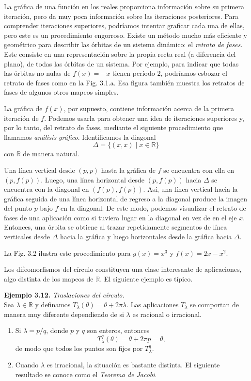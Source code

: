 \documentclass[10pt,a4paper]{book}
\begin{document}
La gráfica de una función en los reales proporciona información sobre su primera iteración, pero da muy poca información sobre las iteraciones posteriores. Para comprender iteraciones superiores, podríamos intentar graficar cada una de ellas, pero este es un procedimiento engorroso. Existe un método mucho más eficiente y geométrico para describir las órbitas de un sistema dinámico: el \emph{retrato de fases}. Este consiste en una representación sobre la propia recta real (a diferencia del plano), de todas las órbitas de un sistema.  Por ejemplo, para indicar que todas las órbitas no nulas de $f(x)=-x$ tienen período $2$, podríamos esbozar el retrato de fases como en la Fig. 3.1.a. Esa figura también muestra los retratos de fases de algunos otros mapeos simples.

\medskip

La gráfica de $f(x)$, por supuesto, contiene información acerca de la primera iteración de $f$. Podemos usarla para obtener una idea de iteraciones superiores y, por lo tanto, del retrato de fases, mediante el siguiente procedimiento que llamamos \emph{análisis gráfico}. Identificamos la diagonal 
\[
\Delta = \{(x,x)\;|\; x \in \mathbb{R}\}
\]
con $\mathbb{R}$ de manera natural.  

Una línea vertical desde $(p,p)$ hasta la gráfica de $f$ se encuentra con ella en $(p,f(p))$. Luego, una línea horizontal desde $(p,f(p))$ hacia $\Delta$ se encuentra con la diagonal en $(f(p),f(p))$. Así, una línea vertical hacia la gráfica seguida de una línea horizontal de regreso a la diagonal produce la imagen del punto $p$ bajo $f$ en la diagonal. De este modo, podemos visualizar el retrato de fases de una aplicación como si tuviera lugar en la diagonal en vez de en el eje $x$. Entonces, una órbita se obtiene al trazar repetidamente segmentos de línea verticales desde $\Delta$ hacia la gráfica y luego horizontales desde la gráfica hacia $\Delta$.  

La Fig. 3.2 ilustra este procedimiento para $g(x)=x^{3}$ y $f(x)=2x-x^{2}$.

\newpage

Los difeomorfismos del círculo constituyen una clase interesante de aplicaciones, algo distinta de los mapeos de $\mathbb{R}$. El siguiente ejemplo es típico.

\medskip

\textbf{Ejemplo 3.12.} \emph{Traslaciones del círculo.}  \\
Sea $\lambda \in \mathbb{R}$ y definamos $T_{\lambda}(\theta)=\theta+2\pi\lambda$.  Las aplicaciones $T_{\lambda}$ se comportan de manera muy diferente dependiendo de si $\lambda$ es racional o irracional. 
\begin{enumerate}
	\item Si $\lambda = p/q$, donde $p$ y $q$ son enteros, entonces \[T_{\lambda}^{q}(\theta) = \theta + 2\pi p = \theta,\]de modo que todos los puntos son fijos por $T_{\lambda}^{q}$.  

	 \item Cuando $\lambda$ es irracional, la situación es bastante distinta.  
El siguiente resultado se conoce como el \emph{Teorema de Jacobi}.
\end{enumerate} 
\end{document}
